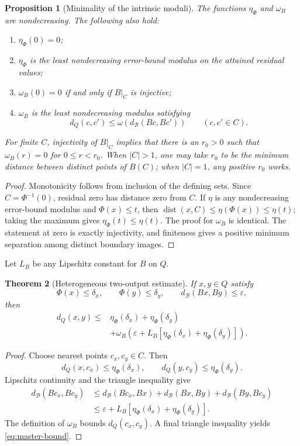 \documentclass[11pt]{article}
\newtheorem{theorem}{Theorem}[section]
\newtheorem{proposition}[theorem]{Proposition}
\theoremstyle{definition}
\theoremstyle{remark}
\numberwithin{equation}{section}
\newcommand{\dist}{\operatorname{dist}}
\newcommand{\cB}{\mathcal B}
\newcommand{\eps}{\varepsilon}
\begin{document}
\begin{proposition}[Minimality of the intrinsic moduli]\label{prop:minimal-moduli}
The functions $\eta_\Phi$ and $\omega_B$ are nondecreasing. The following also hold:
\begin{enumerate}[label=(\roman*)]
\item $\eta_\Phi(0)=0$;
\item $\eta_\Phi$ is the least nondecreasing error-bound modulus on the attained residual values;
\item $\omega_B(0)=0$ if and only if $B|_C$ is injective;
\item $\omega_B$ is the least nondecreasing modulus satisfying
\[
 d_Q(c,c')\le\omega(d_{\cB}(Bc,Bc'))\qquad(c,c'\in C).
\]
\end{enumerate}
For finite $C$, injectivity of $B|_C$ implies that there is an $r_0>0$ such that
$\omega_B(r)=0$ for $0\le r<r_0$.  When $|C|>1$, one may take $r_0$ to be
the minimum distance between distinct points of $B(C)$; when $|C|=1$, any
positive $r_0$ works.
\end{proposition}

\begin{proof}
Monotonicity follows from inclusion of the defining sets.  Since $C=\Phi^{-1}(0)$, residual zero has distance zero from $C$.  If $\eta$ is any nondecreasing error-bound modulus and $\Phi(x)\le t$, then $\dist(x,C)\le\eta(\Phi(x))\le\eta(t)$; taking the maximum gives $\eta_\Phi(t)\le\eta(t)$.  The proof for $\omega_B$ is identical.  The statement at zero is exactly injectivity, and finiteness gives a positive minimum separation among distinct boundary images.
\end{proof}

Let $L_B$ be any Lipschitz constant for $B$ on $Q$.

\begin{theorem}[Heterogeneous two-output estimate]\label{thm:master-bound}
If $x,y\in Q$ satisfy
\[
 \Phi(x)\le\delta_x,\qquad \Phi(y)\le\delta_y,
 \qquad d_{\cB}(Bx,By)\le\eps,
\]
then
\begin{equation}\label{eq:master-bound}
\begin{split}
 d_Q(x,y)\le{}&\eta_\Phi(\delta_x)+\eta_\Phi(\delta_y)\\
 &+\omega_B\!\left(
 \eps+L_B[\eta_\Phi(\delta_x)+\eta_\Phi(\delta_y)]
 \right).
\end{split}
\end{equation}
\end{theorem}

\begin{proof}
Choose nearest points $c_x,c_y\in C$.  Then
\[
 d_Q(x,c_x)\le\eta_\Phi(\delta_x),\qquad
 d_Q(y,c_y)\le\eta_\Phi(\delta_y).
\]
Lipschitz continuity and the triangle inequality give
\begin{align*}
 d_{\cB}(Bc_x,Bc_y)
 &\le d_{\cB}(Bc_x,Bx)+d_{\cB}(Bx,By)+d_{\cB}(By,Bc_y)\\
 &\le \eps+L_B[\eta_\Phi(\delta_x)+\eta_\Phi(\delta_y)].
\end{align*}
The definition of $\omega_B$ bounds $d_Q(c_x,c_y)$.  A final triangle inequality yields \eqref{eq:master-bound}.
\end{proof}
\end{document}
